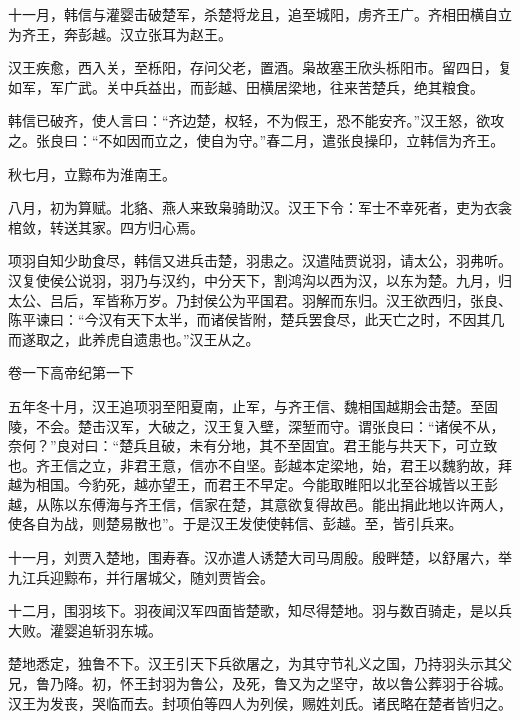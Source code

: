 \documentclass[12pt,UTF8]{ctexbook}
\begin{document}
十一月，韩信与灌婴击破楚军，杀楚将龙且，追至城阳，虏齐王广。齐相田横自立为齐王，奔彭越。汉立张耳为赵王。



汉王疾愈，西入关，至栎阳，存问父老，置酒。枭故塞王欣头栎阳市。留四日，复如军，军广武。关中兵益出，而彭越、田横居梁地，往来苦楚兵，绝其粮食。



韩信已破齐，使人言曰：“齐边楚，权轻，不为假王，恐不能安齐。”汉王怒，欲攻之。张良曰：“不如因而立之，使自为守。”春二月，遣张良操印，立韩信为齐王。



秋七月，立黥布为淮南王。



八月，初为算赋。北貉、燕人来致枭骑助汉。汉王下令：军士不幸死者，吏为衣衾棺敛，转送其家。四方归心焉。



项羽自知少助食尽，韩信又进兵击楚，羽患之。汉遣陆贾说羽，请太公，羽弗听。汉复使侯公说羽，羽乃与汉约，中分天下，割鸿沟以西为汉，以东为楚。九月，归太公、吕后，军皆称万岁。乃封侯公为平国君。羽解而东归。汉王欲西归，张良、陈平谏曰：“今汉有天下太半，而诸侯皆附，楚兵罢食尽，此天亡之时，不因其几而遂取之，此养虎自遗患也。”汉王从之。





卷一下高帝纪第一下



五年冬十月，汉王追项羽至阳夏南，止军，与齐王信、魏相国越期会击楚。至固陵，不会。楚击汉军，大破之，汉王复入壁，深堑而守。谓张良曰：“诸侯不从，奈何？”良对曰：“楚兵且破，未有分地，其不至固宜。君王能与共天下，可立致也。齐王信之立，非君王意，信亦不自坚。彭越本定梁地，始，君王以魏豹故，拜越为相国。今豹死，越亦望王，而君王不早定。今能取睢阳以北至谷城皆以王彭越，从陈以东傅海与齐王信，信家在楚，其意欲复得故邑。能出捐此地以许两人，使各自为战，则楚易散也”。于是汉王发使使韩信、彭越。至，皆引兵来。



十一月，刘贾入楚地，围寿春。汉亦遣人诱楚大司马周殷。殷畔楚，以舒屠六，举九江兵迎黥布，并行屠城父，随刘贾皆会。



十二月，围羽垓下。羽夜闻汉军四面皆楚歌，知尽得楚地。羽与数百骑走，是以兵大败。灌婴追斩羽东城。



楚地悉定，独鲁不下。汉王引天下兵欲屠之，为其守节礼义之国，乃持羽头示其父兄，鲁乃降。初，怀王封羽为鲁公，及死，鲁又为之坚守，故以鲁公葬羽于谷城。汉王为发丧，哭临而去。封项伯等四人为列侯，赐姓刘氏。诸民略在楚者皆归之。
\end{document}
